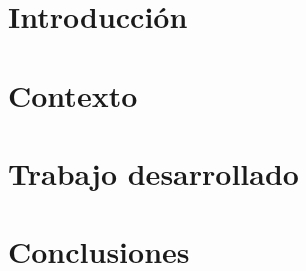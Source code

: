 \documentclass[12pt, a4paper, titlepage, twoside, openright, spanish]{report}
\makeatletter
\def\cleardoublepage{\clearpage\if@twoside \ifodd\c@page\else
	\hbox{}
	\vspace*{\fill}
	\begin{center}
		\thepage
	\end{center}
	\thispagestyle{empty}
	\newpage
	\if@twocolumn\hbox{}\newpage\fi\fi\fi}
\makeatother
\begin{document}
	
	\cleardoublepage
	
	
	\cleardoublepage
	
	
	\cleardoublepage
	
	
	
	\cleardoublepage
	
	
	\cleardoublepage
	
	
	\cleardoublepage
	
	\tableofcontents
	\cleardoublepage
	
	\pagestyle{fancy}
	\renewcommand{\chaptermark}[1]{\markboth{
			{\thechapter.\ #1}}{}}
	\renewcommand{\sectionmark}[1]{\markright{
			{\thesection\  #1}}{}}
	
	\hypertarget{introduccion}{\chapter{Introducción}}
	\label{introduction}
	
	\cleardoublepage
	
	\hypertarget{background}{\chapter{Contexto}}
	\label{background}
	
	\cleardoublepage

	\hypertarget{mainwork}{\chapter{Trabajo desarrollado}}
	\label{mainwork}
	
	\cleardoublepage
	
	
	\hypertarget{conclusions}{\chapter{Conclusiones}}
	\label{conclusions}
	
	\cleardoublepage
	
\end{document}
